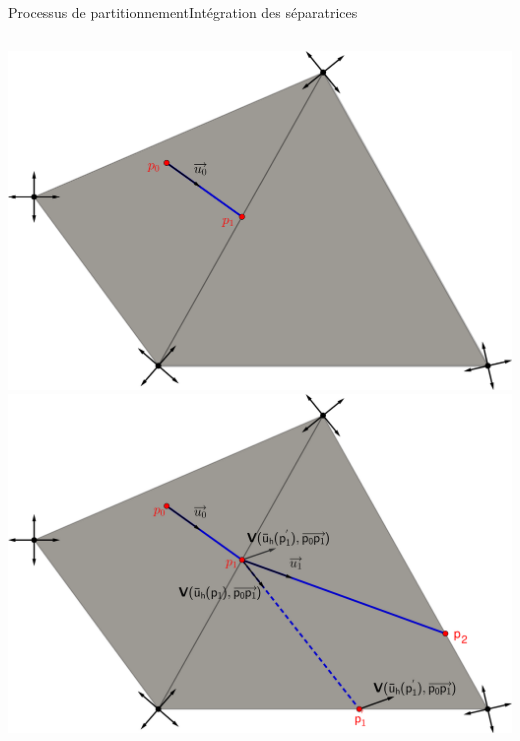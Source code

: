 \documentclass[compress,10pt,aspectratio=169]{beamer}
\begin{document}
\begin{frame}{Processus de partitionnement}{Intégration des séparatrices}

\small
\begin{columns}
\begin{column}{0.5\textwidth}
\centering
\vspace{-0.3cm}
\includegraphics[scale=0.1]{images/draw_streams_11.pdf}\\\vspace{0.2cm}
\includegraphics[scale=0.1]{images/draw_streams_12.pdf}\\\vspace{0.3cm}
\end{column}


\end{columns}
\end{frame}
\end{document}
